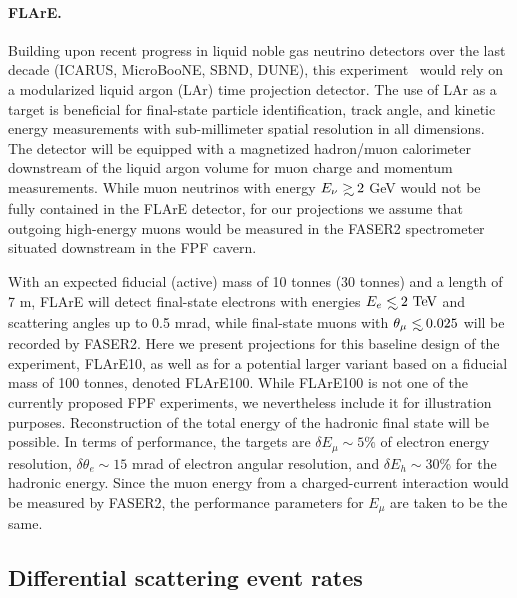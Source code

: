  \paragraph{FLArE.}
 Building upon recent progress in liquid noble gas neutrino detectors over the last decade (ICARUS, MicroBooNE, SBND, DUNE), this experiment~\cite{Batell:2021blf,Feng:2022inv}
 would rely on a modularized liquid argon (LAr) time projection detector.
 The use of LAr as a target is beneficial for final-state particle identification, track angle, and kinetic energy measurements with sub-millimeter spatial resolution in all dimensions.
 The detector will be equipped with a magnetized hadron/muon calorimeter downstream of the liquid argon volume
 for muon charge and momentum measurements.
 While muon neutrinos with energy $E_\nu \gsim 2$ GeV would not be fully
 contained in the  FLArE detector,
for our projections
we assume that outgoing high-energy
muons would be measured in the FASER2 spectrometer
  situated downstream in the FPF cavern.
 
 With an expected fiducial (active) mass of 10 tonnes (30 tonnes) and a length of 7 m, FLArE will
 detect final-state electrons with energies $E_{e}\lsim 2~\rm{TeV}$ and
 scattering angles up to 0.5 mrad,  while final-state muons
 with $\theta_\mu \lsim 0.025$ will be recorded by FASER2.
 Here we present  projections for this baseline design of the experiment, FLArE10,
 as well as for a potential larger variant based on a fiducial mass of 100 tonnes,
 denoted FLArE100.
 While FLArE100 is not one of the currently proposed FPF experiments, we nevertheless
 include it for illustration purposes.
 Reconstruction of the total energy of the hadronic final state will be
 possible. 
 In terms of performance, the targets
 are $\delta E_\mu \sim5\%$ of electron energy resolution,
 $\delta \theta_e \sim 15$ mrad of electron angular  resolution,
 and $\delta E_h \sim 30$\% for the hadronic energy.
 Since the muon energy from a charged-current interaction would be measured by FASER2, the
 performance parameters for $E_\mu$ are taken to be the same.

\subsection{Differential scattering event rates}
\label{sec:pseudo-data_generation}

